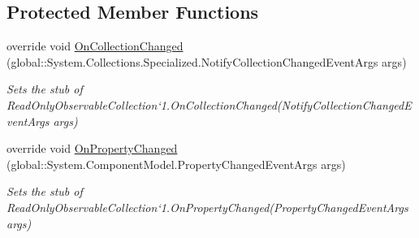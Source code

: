 \subsection*{Protected Member Functions}
\begin{DoxyCompactItemize}
\item 
override void \hyperlink{class_system_1_1_collections_1_1_object_model_1_1_fakes_1_1_stub_read_only_observable_collection_3_01_t_01_4_a8686c7d31568df8de288fbb79b7de3b3}{On\-Collection\-Changed} (global\-::\-System.\-Collections.\-Specialized.\-Notify\-Collection\-Changed\-Event\-Args args)
\begin{DoxyCompactList}\small\item\em Sets the stub of Read\-Only\-Observable\-Collection`1.On\-Collection\-Changed(\-Notify\-Collection\-Changed\-Event\-Args args)\end{DoxyCompactList}\item 
override void \hyperlink{class_system_1_1_collections_1_1_object_model_1_1_fakes_1_1_stub_read_only_observable_collection_3_01_t_01_4_a781de2ff65cc71030d061f7a7c9804af}{On\-Property\-Changed} (global\-::\-System.\-Component\-Model.\-Property\-Changed\-Event\-Args args)
\begin{DoxyCompactList}\small\item\em Sets the stub of Read\-Only\-Observable\-Collection`1.On\-Property\-Changed(\-Property\-Changed\-Event\-Args args)\end{DoxyCompactList}\end{DoxyCompactItemize}
